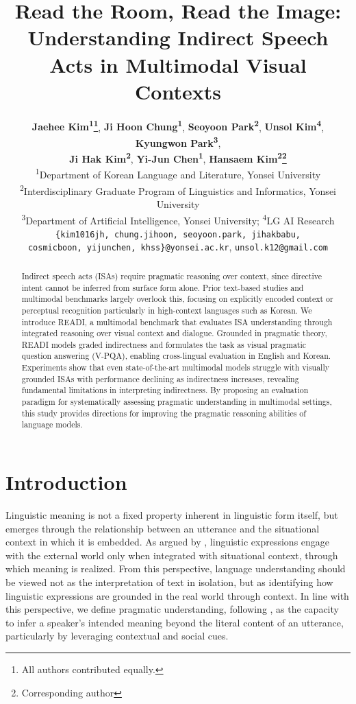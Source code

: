 \documentclass[11pt]{article}
\title{Read the Room, Read the Image: Understanding Indirect Speech Acts in Multimodal Visual Contexts}
\author{
\textbf{Jaehee Kim\textsuperscript{1}\thanks{All authors contributed equally.}},
\textbf{Ji Hoon Chung\textsuperscript{1}\footnotemark[1]},
\textbf{Seoyoon Park\textsuperscript{2}\footnotemark[1]},
\textbf{Unsol Kim\textsuperscript{4}\footnotemark[1]},
\textbf{Kyungwon Park\textsuperscript{3}\footnotemark[1]},\\
\textbf{Ji Hak Kim\textsuperscript{2}\footnotemark[1]},
\textbf{Yi-Jun Chen\textsuperscript{1}\footnotemark[1]},
\textbf{Hansaem Kim\textsuperscript{2}\thanks{Corresponding author}}\\
\textsuperscript{1}Department of Korean Language and Literature, Yonsei University\\
\textsuperscript{2}Interdisciplinary Graduate Program of Linguistics and Informatics, Yonsei University\\
\textsuperscript{3}Department of Artificial Intelligence, Yonsei University; \textsuperscript{4}LG AI Research\\
\texttt{\{kim1016jh, chung.jihoon, seoyoon.park, jihakbabu,}\\
\texttt{cosmicboon, yijunchen, khss\}@yonsei.ac.kr},
\texttt{unsol.k12@gmail.com}
}
\begin{document}
\maketitle
\begin{abstract}
Indirect speech acts (ISAs) require pragmatic reasoning over context, since directive intent cannot be inferred from surface form alone. Prior text-based studies and multimodal benchmarks largely overlook this, focusing on explicitly encoded context or perceptual recognition particularly in high-context languages such as Korean. We introduce READI, a multimodal benchmark that evaluates ISA understanding through integrated reasoning over visual context and dialogue. Grounded in pragmatic theory, READI models graded indirectness and formulates the task as visual pragmatic question answering (V-PQA), enabling cross-lingual evaluation in English and Korean. Experiments show that even state-of-the-art multimodal models struggle with visually grounded ISAs with performance declining as indirectness increases, revealing fundamental limitations in interpreting indirectness. By proposing an evaluation paradigm for systematically assessing pragmatic understanding in multimodal settings, this study provides directions for improving the pragmatic reasoning abilities of language models.
\end{abstract}
\section{Introduction}
Linguistic meaning is not a fixed property inherent in linguistic form itself, but emerges through the relationship between an utterance and the situational context in which it is embedded. As argued by \citet{widdowson2004text}, linguistic expressions engage with the external world only when integrated with situational context, through which meaning is realized. From this perspective, language understanding should be viewed not as the interpretation of text in isolation, but as identifying how linguistic expressions are grounded in the real world through context. In line with this perspective, we define pragmatic understanding, following \citet{leech19836principles}, as the capacity to infer a speaker’s intended meaning beyond the literal content of an utterance, particularly by leveraging contextual and social cues.
\end{document}
